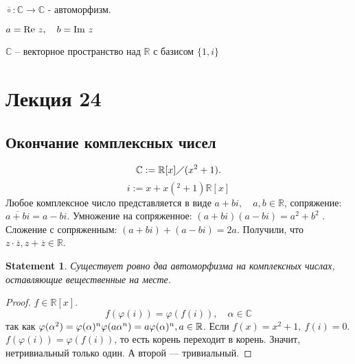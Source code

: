 \documentclass[11pt]{book}
\newcommand{\R}{\mathbb{R}}
\newcommand{\Cm}{\mathbb{C}}
\newcommand{\im}{{\mathop{\text{\rm Im}}}~}
\newcommand{\re}{{\mathop{\text{\rm Re}}}~}
\theoremstyle{definition}
\theoremstyle{plain}
\theoremstyle{plain}
\newtheorem*{st}{Statement}
\theoremstyle{definition}
\theoremstyle{remark}
\begin{document}
   $\overline{\circ} :\Cm \to  \Cm$  - автоморфизм.

   $a = \re z, \quad b = \im z$
   
   $\Cm$ -- векторное пространство над $\R$ с базисом $\{1, i\}$

\section{Лекция 24}
\subsection{Окончание комплексных чисел}
   \[
       \Cm := \R[x] \diagup (x^2 + 1)
   .\] 
   $$i := x + x(^2+1)\R[x]$$
   Любое комплексное число представляется в виде $a + bi, \quad a, b \in \R$, сопряжение: $\overline{a+ bi} = a - bi$.
   Умножение на сопряженное: $(a+bi) (a-bi) = a^2 + b^2$ .
   Сложение с сопряженным: $(a+bi) + (a-bi) = 2a$.
   Получили, что $z \cdot \overline{z} , z + \overline{z} \in \R$.

   \begin{st}
       Существует ровно два автоморфизма на комплексных числах, оставляющие вещественные на месте.
   \end{st}
   \begin{proof}
       $f \in  \R[x]$.
       \[
	   f( \varphi (i)) = \varphi  (f(i)), \quad \alpha \in  \Cm
       \]  
       так как $\varphi ( \alpha ^2)  = \varphi ( \alpha )^n \\
       \varphi (a \alpha ^n) = a \varphi ( \alpha )^n, a \in  \R$.
       Если $f(x) = x^2 + 1, ~ f(i) = 0$. 
       $f( \varphi (i)) = \varphi (f(i))$, то есть корень переходит в корень. Значит, нетривиальный только один.
       А второй --- тривиальный.
   \end{proof}
\end{document}
